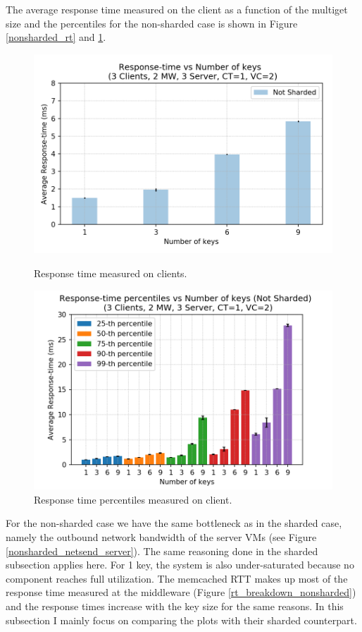 The average response time measured on the client as a function of the multiget size and the percentiles for the non-sharded case is shown in Figure \ref{nonsharded_rt} and \ref{nonsharded_percentiles}.
\begin{figure}[H]
   \begin{minipage}{0.48\textwidth}
     \centering
     \includegraphics[width=1\linewidth]{figures/4_GetsAndMultigets/mem_rt_nonsharded_2018-11-22_18h12.png}
     \caption{Response time measured on clients.}\label{nonsharded_rt}
   \end{minipage}\hfill
   \begin{minipage}{0.48\textwidth}
     \centering
     \includegraphics[width=1\linewidth]{figures/4_GetsAndMultigets/mem_perc_nonsharded_2018-11-22_18h12.png}
     \caption{Response time percentiles measured on client.}\label{nonsharded_percentiles}
   \end{minipage}
\end{figure}
For the non-sharded case we have the same bottleneck as in the sharded case, namely the outbound network bandwidth of the server VMs (see Figure \ref{nonsharded_netsend_server}). The same reasoning done in the sharded subsection applies here. For 1 key, the system is also under-saturated because no component reaches full utilization.  The memcached RTT makes up most of the response time measured at the middleware (Figure \ref{rt_breakdown_nonsharded}) and the response times increase with the key size for the same reasons. In this subsection I mainly focus on comparing the plots with their sharded counterpart. 


